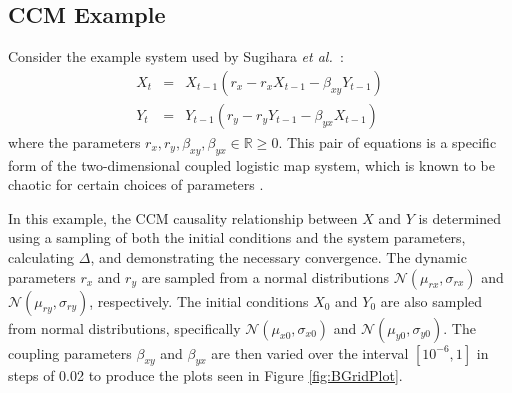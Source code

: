 \documentclass[twocolumn,aps,pre,groupedaddress]{revtex4-1}
\begin{document}
\subsection{CCM Example}
\label{sec:2Pop}
Consider the example system used by Sugihara {\em et al.\ }\cite{Sugihara2012}:
\begin{eqnarray}
\label{eqn:2pop}
X_t &=& X_{t-1}\left(r_x-r_x X_{t-1}-\beta_{xy} Y_{t-1}\right)\\
Y_t &=& Y_{t-1}\left(r_y-r_y Y_{t-1}-\beta_{yx} X_{t-1}\right)
\end{eqnarray}
where the parameters $r_x,r_y,\beta_{xy},\beta_{yx}\in\mathbb{R}\ge 0$.  This pair of equations is a specific form of the two-dimensional coupled logistic map system, which is known to be chaotic for certain choices of parameters \cite{Lloyd1995}.

In this example, the CCM causality relationship between $X$ and $Y$ is determined using a sampling of both the initial conditions and the system parameters, calculating $\Delta$, and demonstrating the necessary convergence.  The dynamic parameters $r_x$ and $r_y$ are sampled from a normal distributions $\mathcal{N}\left(\mu_{rx},\sigma_{rx}\right)$ and $\mathcal{N}\left(\mu_{ry},\sigma_{ry}\right)$, respectively.  The initial conditions $X_0$ and $Y_0$ are also sampled from normal distributions, specifically $\mathcal{N}\left(\mu_{x0},\sigma_{x0}\right)$ and $\mathcal{N}\left(\mu_{y0},\sigma_{y0}\right)$.  The coupling parameters $\beta_{xy}$ and $\beta_{yx}$ are then varied over the interval $[10^{-6},1]$ in steps of 0.02 to produce the plots seen in Figure \ref{fig:BGridPlot}.
\end{document}
